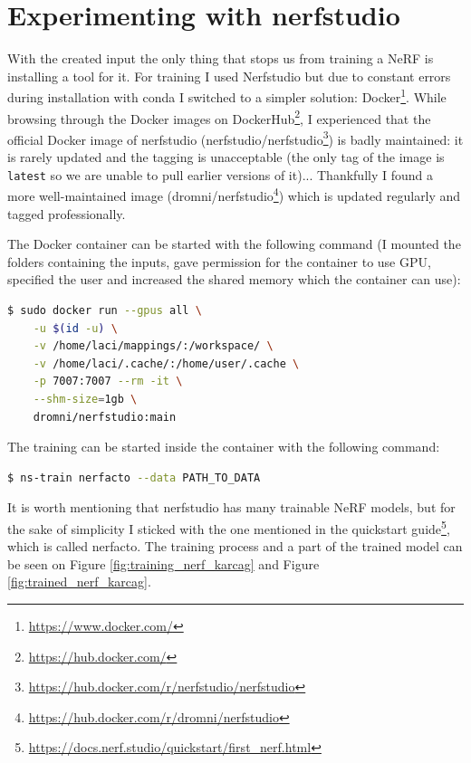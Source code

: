 \section{Experimenting with nerfstudio}

With the created input the only thing that stops us from training a NeRF is installing a tool for it. For training I used Nerfstudio\cite{nerfstudio} but due to constant errors during installation with conda I switched to a simpler solution: Docker\footnote{\url{https://www.docker.com/}}. While browsing through the Docker images on DockerHub\footnote{\url{https://hub.docker.com/}}, I experienced that the official Docker image of nerfstudio (nerfstudio/nerfstudio\footnote{\url{https://hub.docker.com/r/nerfstudio/nerfstudio}}) is badly maintained: it is rarely updated and the tagging is unacceptable (the only tag of the image is \verb|latest| so we are unable to pull earlier versions of it)... Thankfully I found a more well-maintained image (dromni/nerfstudio\footnote{\url{https://hub.docker.com/r/dromni/nerfstudio}}) which is updated regularly and tagged professionally.

The Docker container can be started with the following command (I mounted the folders containing the inputs, gave permission for the container to use GPU, specified the user and increased the shared memory which the container can use):

\FloatBarrier
\begin{lstlisting}[language=bash,frame=single,float=!ht]
$ sudo docker run --gpus all \
    -u $(id -u) \
    -v /home/laci/mappings/:/workspace/ \
    -v /home/laci/.cache/:/home/user/.cache \
    -p 7007:7007 --rm -it \
    --shm-size=1gb \
    dromni/nerfstudio:main
\end{lstlisting}

The training can be started inside the container with the following command:
\FloatBarrier
\begin{lstlisting}[language=bash,frame=single,float=!ht]
$ ns-train nerfacto --data PATH_TO_DATA
\end{lstlisting}
It is worth mentioning that nerfstudio has many trainable NeRF models, but for the sake of simplicity I sticked with the one mentioned in the quickstart guide\footnote{\url{https://docs.nerf.studio/quickstart/first_nerf.html}}, which is called nerfacto. The training process and a part of the trained model can be seen on Figure \ref{fig:training_nerf_karcag} and Figure \ref{fig:trained_nerf_karcag}.

